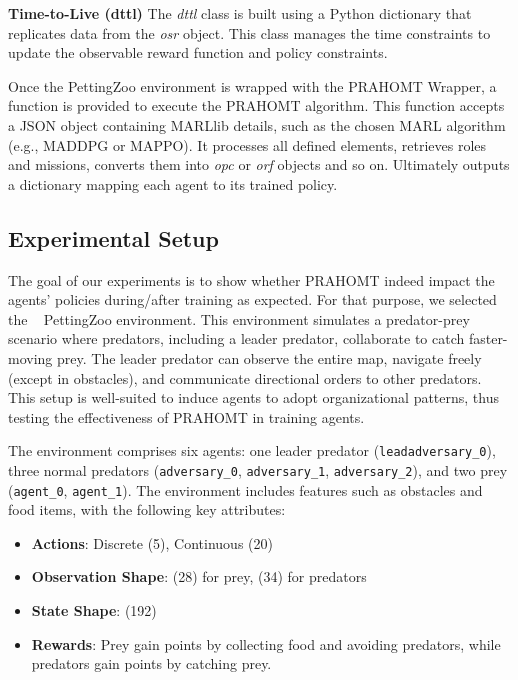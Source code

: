 \documentclass[runningheads]{llncs}
\theoremstyle{freethm}
\theoremstyle{proofoutline}
\begin{document}
\textbf{Time-to-Live (dttl)} \quad The \textit{dttl} class is built using a Python dictionary that replicates data from the \textit{osr} object. This class manages the time constraints to update the observable reward function and policy constraints.

Once the PettingZoo environment is wrapped with the PRAHOMT Wrapper, a function is provided to execute the PRAHOMT algorithm. This function accepts a JSON object containing MARLlib details, such as the chosen MARL algorithm (e.g., MADDPG or MAPPO). It processes all defined elements, retrieves roles and missions, converts them into \textit{opc} or \textit{orf} objects and so on. Ultimately outputs a dictionary mapping each agent to its trained policy.


\subsection{Experimental Setup}

The goal of our experiments is to show whether PRAHOMT indeed impact the agents' policies during/after training as expected. For that purpose, we selected the ~\cite{Lowe2017} PettingZoo environment. This environment simulates a predator-prey scenario where predators, including a leader predator, collaborate to catch faster-moving prey. The leader predator can observe the entire map, navigate freely (except in obstacles), and communicate directional orders to other predators. This setup is well-suited to induce agents to adopt organizational patterns, thus testing the effectiveness of PRAHOMT in training agents.

The  environment comprises six agents: one leader predator (\texttt{leadadversary\_0}), three normal predators (\texttt{adversary\_0}, \texttt{adversary\_1}, \texttt{adversary\_2}), and two prey (\texttt{agent\_0}, \texttt{agent\_1}). The environment includes features such as obstacles and food items, with the following key attributes:

\begin{itemize}
    \item \textbf{Actions}: Discrete (5), Continuous (20)
    \item \textbf{Observation Shape}: (28) for prey, (34) for predators
    \item \textbf{State Shape}: (192)
    \item \textbf{Rewards}: Prey gain points by collecting food and avoiding predators, while predators gain points by catching prey.
\end{itemize}
\end{document}
